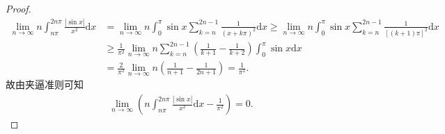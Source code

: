 \documentclass[../../main.tex]{subfiles}
\begin{document}
\begin{proof}
\begin{align*}
\lim_{n \to \infty} n \int_{n\pi}^{2n\pi} \frac{|\sin x|}{x^2} \mathrm{d}x &= \lim_{n \to \infty} n \int_0^{\pi} \sin x \sum_{k=n}^{2n - 1} \frac{1}{(x + k\pi)^2} \mathrm{d}x \geqslant  \lim_{n \to \infty} n \int_0^{\pi} \sin x \sum_{k=n}^{2n - 1} \frac{1}{[(k + 1)\pi]^2} \mathrm{d}x 
\\
&\geqslant  \frac{1}{\pi^2} \lim_{n \to \infty} n \sum_{k=n}^{2n - 1} \left( \frac{1}{k + 1} - \frac{1}{k + 2} \right) \int_0^{\pi} \sin x \mathrm{d}x \\
&= \frac{2}{\pi^2} \lim_{n \to \infty} n \left( \frac{1}{n + 1} - \frac{1}{2n + 1} \right) = \frac{1}{\pi^2}.
\end{align*}
故由夹逼准则可知
\begin{align*}
\lim_{n \to \infty} \left( n \int_{n\pi}^{2n\pi} \frac{|\sin x|}{x^2} \mathrm{d}x - \frac{1}{\pi^2} \right) = 0.
\end{align*}

\end{proof}
\end{document}
